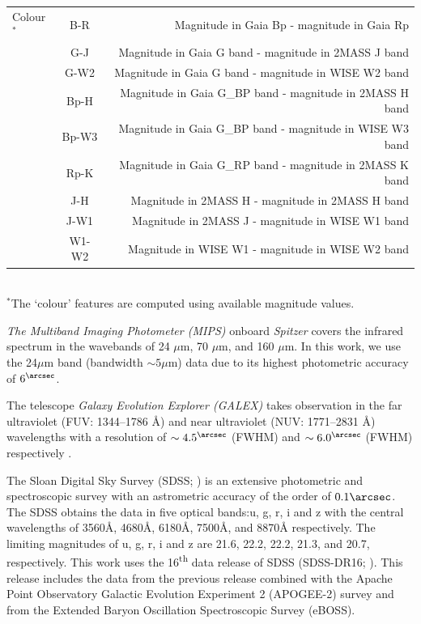 \documentclass[fleqn,usenatbib]{mnras}
\begin{document}
\begin{table}
\begin{tabular}{lcr}
    Colour$^*$ & B-R                  & Magnitude in Gaia Bp - magnitude in Gaia Rp               \\
                     & G-J                  & Magnitude in Gaia G band  - magnitude in 2MASS J band     \\
                     & G-W2                 & Magnitude in Gaia G band  - magnitude in WISE W2 band     \\
                     & Bp-H                 & Magnitude in Gaia G\_BP band  - magnitude in 2MASS H band \\
         & Bp-W3                & Magnitude in Gaia G\_BP band  - magnitude in WISE W3 band           \\
                     & Rp-K                 & Magnitude in Gaia G\_RP band  - magnitude in 2MASS K band \\
                     & J-H                  & Magnitude in 2MASS H - magnitude in 2MASS H band          \\
                     & J-W1                 & Magnitude in 2MASS J - magnitude in WISE W1 band          \\
                     & W1-W2                & Magnitude in WISE W1 - magnitude in WISE W2 band          \\ \hline
    
    \end{tabular}%
    \\
    $^*$The `colour' features are computed using available magnitude values.
    \end{table}

{\em The Multiband Imaging Photometer (MIPS)} onboard {\em Spitzer} \citep{2004ApJS..154...25R, 2013AAS...22134006C} covers the infrared spectrum in the wavebands of 24 $\mu$m, 70 $\mu$m, and 160 $\mu$m. In this work, we use the 24$\mu$m band (bandwidth $\sim 5\mu$m) data due to its highest photometric accuracy of $6^{\arcsec}$.

The telescope {\em Galaxy Evolution Explorer  (GALEX)}  takes observation in the far ultraviolet (FUV: 1344–1786 \AA ) and near ultraviolet (NUV: 1771–2831 \AA) wavelengths with a resolution of $\sim 4.5^{\arcsec}$ (FWHM) and $\sim 6.0^{\arcsec}$ (FWHM) respectively \citep{2005ApJ...619L...7M}.

The Sloan Digital Sky Survey (SDSS; \cite{2000AJ....120.1579Y}) is an extensive photometric and spectroscopic survey with an astrometric accuracy of the order of $0.1\arcsec$. The SDSS obtains the data in five optical bands:u, g, r, i and z with the central wavelengths of 3560{\AA}, 4680{\AA}, 6180{\AA}, 7500{\AA}, and 8870{\AA} respectively. The limiting magnitudes of u, g, r, i and z are 21.6, 22.2, 22.2, 21.3, and 20.7, respectively. This work uses the 16\textsuperscript{th} data release of SDSS (SDSS-DR16; \cite{2020ApJS..249....3A}). This release includes the data from the previous release combined with the Apache Point Observatory Galactic Evolution Experiment 2 (APOGEE-2) survey and from the Extended Baryon Oscillation Spectroscopic Survey (eBOSS).
\end{document}
